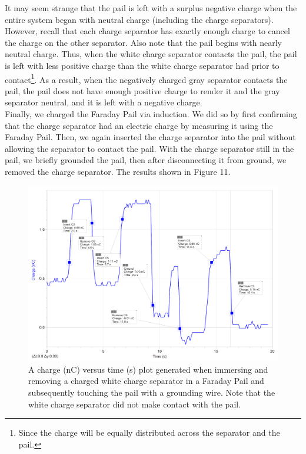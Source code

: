 \documentclass[12pt]{amsart}
\begin{document}
\indent It may seem strange that the pail is left with a surplus negative charge when the entire system began with neutral charge (including the charge separators). However, recall that each charge separator has exactly enough charge to cancel the charge on the other separator. Also note that the pail begins with nearly neutral charge. Thus, when the white charge separator contacts the pail, the pail is left with less positive charge than the white charge separator had prior to contact\footnote{Since the charge will be equally distributed across the separator and the pail.}. As a result, when the negatively charged gray separator contacts the pail, the pail does not have enough positive charge to render it and the gray separator neutral, and it is left with a negative charge.\\

\indent Finally, we charged the Faraday Pail via induction. We did so by first confirming that the charge separator had an electric charge by measuring it using the Faraday Pail. Then, we again inserted the charge separator into the pail without allowing the separator to contact the pail. With the charge separator still in the pail, we briefly grounded the pail, then after disconnecting it from ground, we removed the charge separator. The results shown in Figure 11.
\begin{figure}[h]
	\includegraphics[width=\medgraph,scale=0.01]{SeparatorInduction.png}
	\caption{A charge (nC) versus time (s) plot generated when immersing and removing a charged white charge separator in a Faraday Pail and subsequently touching the pail with a grounding wire. Note that the white charge separator did not make contact with the pail.}
	\label{Induction}
\end{figure} 
\end{document}
